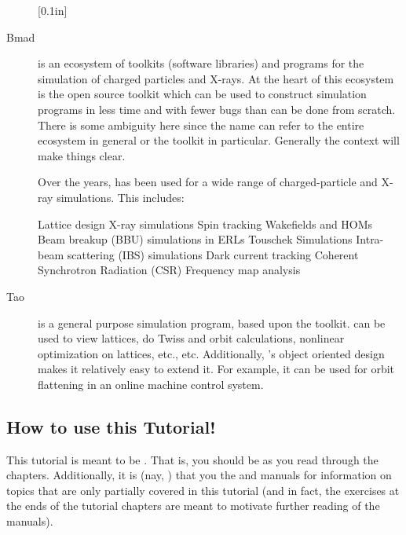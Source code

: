 \documentclass{hitec}     %
\begin{document}
\begin{description}
%
[0.1in]
%
\item[Bmad] \Newline
\bmad is an ecosystem of toolkits (software libraries) and programs for the simulation of charged
particles and X-rays. At the heart of this ecosystem is the open source \bmad toolkit which can be
used to construct simulation programs in less time and with fewer bugs than can be done from
scratch. There is some ambiguity here since the name \bmad can refer to the entire ecosystem in
general or the \bmad toolkit in particular. Generally the context will make things clear.

Over the years, \bmad has been used for a wide range of charged-particle and X-ray simulations. This
includes:
\begin{code}
Lattice design                                  X-ray simulations
Spin tracking                                   Wakefields and HOMs
Beam breakup (BBU) simulations in ERLs          Touschek Simulations
Intra-beam scattering (IBS) simulations         Dark current tracking
Coherent Synchrotron Radiation (CSR)            Frequency map analysis
\end{code}
%
\item[Tao] \Newline
\tao is a general purpose simulation program, based upon the \bmad toolkit. \tao can be used to view
lattices, do Twiss and orbit calculations, nonlinear optimization on lattices, etc., etc.
Additionally, \tao's object oriented design makes it relatively easy to extend it. For example, it
can be used for orbit flattening in an online machine control system.
  \end{description}

\subsection{How to use this Tutorial!}
\label{s:use.tutorial}

This tutorial is meant to be . That is, you should be  as you read
through the chapters. Additionally, it is  (nay, ) that you 
the  and  manuals for information on topics that are only partially covered in this
tutorial (and in fact, the exercises at the ends of the tutorial chapters are meant to motivate
further reading of the manuals).
\end{document}
